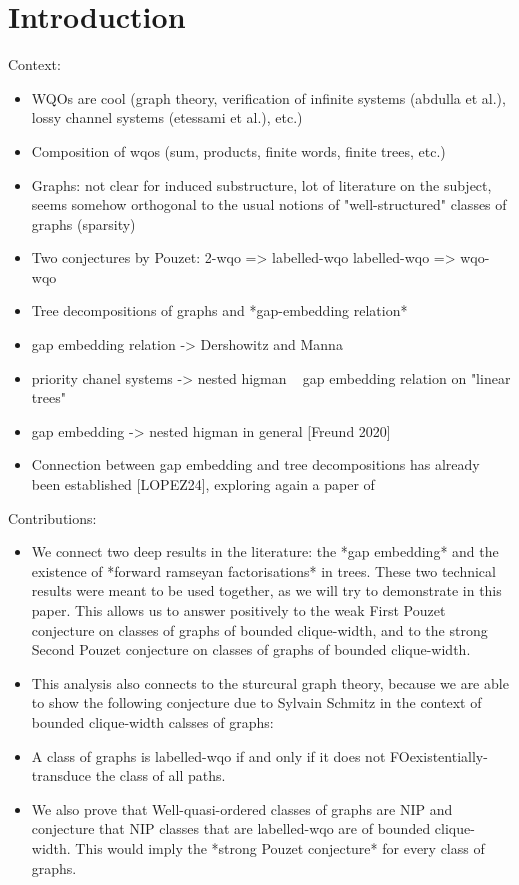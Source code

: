 \section{Introduction}
\label{sec:introduction}

 Context:
 \begin{itemize}
 \item WQOs are cool (graph theory, verification of infinite systems (abdulla et al.),
                  lossy channel systems (etessami et al.), etc.)
 \item Composition of wqos (sum, products, finite words, finite trees, etc.)
 \item Graphs: not clear for induced substructure, lot of literature on the subject, seems
   somehow orthogonal to the usual notions of "well-structured" classes of graphs (sparsity)
 \item Two conjectures by Pouzet:
       2-wqo => labelled-wqo
       labelled-wqo => wqo-wqo
 \item Tree decompositions of graphs and *gap-embedding relation*
   \item gap embedding relation  -> Dershowitz and Manna
   \item priority chanel systems -> nested higman ~ gap embedding relation on "linear trees"
   \item gap embedding -> nested higman in general [Freund 2020]
 \item Connection between gap embedding and tree decompositions has already been 
   established [LOPEZ24], exploring again a paper of \cite{DRT10}
\end{itemize}
 
 Contributions:
 \begin{itemize}
     \item We connect two deep results in the literature: the *gap embedding*
 and the existence of *forward ramseyan factorisations* in trees.
 These two technical results were meant to be used together, as we will try to
 demonstrate in this paper.
 This allows us to answer positively to the weak First Pouzet conjecture on
 classes of graphs of bounded clique-width, and to the strong Second Pouzet conjecture
 on classes of graphs of bounded clique-width.

\item This analysis also connects to the sturcural graph theory, because we 
 are able to show the following conjecture due to Sylvain Schmitz
 in the context of bounded clique-width calsses of graphs:

 \item  A class of graphs is labelled-wqo if and only if it does not FOexistentially-transduce
 the class of all paths.

\item We also prove  that
 Well-quasi-ordered classes of graphs  are NIP
 and conjecture that 
 NIP classes that are labelled-wqo are of bounded clique-width.
 This would imply the *strong Pouzet conjecture* for every class of graphs.
\end{itemize}



